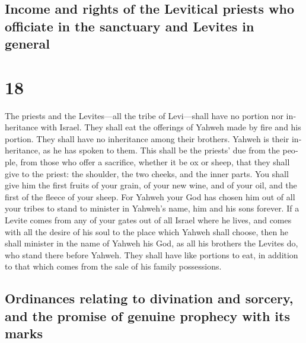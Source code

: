 \begin{paracol}{2}
\begin{otherlanguage}{english}
\hypertarget{income-and-rights-of-the-levitical-priests-who-officiate-in-the-sanctuary-and-levites-in-general}{%
\subsection{Income and rights of the Levitical priests who officiate in
the sanctuary and Levites in
general}\label{income-and-rights-of-the-levitical-priests-who-officiate-in-the-sanctuary-and-levites-in-general}}

\hypertarget{section-35}{%
\section{18}\label{section-35}}

 The priests and the Levites---all the tribe of
Levi---shall have no portion nor inheritance with Israel. They shall eat
the offerings of Yahweh made by fire and his portion. 
They shall have no inheritance among their brothers. Yahweh is their
inheritance, as he has spoken to them.  This shall be the
priests' due from the people, from those who offer a sacrifice, whether
it be ox or sheep, that they shall give to the priest: the shoulder, the
two cheeks, and the inner parts.  You shall give him the
first fruits of your grain, of your new wine, and of your oil, and the
first of the fleece of your sheep.  For Yahweh your God
has chosen him out of all your tribes to stand to minister in Yahweh's
name, him and his sons forever.  If a Levite comes from
any of your gates out of all Israel where he lives, and comes with all
the desire of his soul to the place which Yahweh shall choose,
 then he shall minister in the name of Yahweh his God, as
all his brothers the Levites do, who stand there before Yahweh.
 They shall have like portions to eat, in addition to that
which comes from the sale of his family possessions.

\hypertarget{ordinances-relating-to-divination-and-sorcery-and-the-promise-of-genuine-prophecy-with-its-marks}{%
\subsection{Ordinances relating to divination and sorcery, and the
promise of genuine prophecy with its
marks}\label{ordinances-relating-to-divination-and-sorcery-and-the-promise-of-genuine-prophecy-with-its-marks}}


\end{otherlanguage}
\end{paracol}
